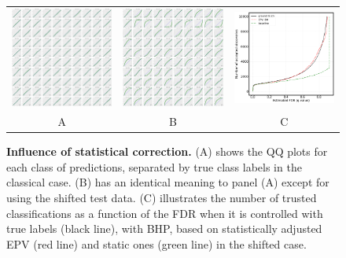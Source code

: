 \documentclass{article}
\begin{document}
\begin{figure}
    \centering
        \begin{tabular}{ccc}
 		\includegraphics[width=2in]{img/good_QQQ.png} &
		\includegraphics[width=2in]{img/bad_QQQ.png} & 
		\includegraphics[width=2in]{img/cnn_shift_stats_prove.png}
		\\	
		A & B & C
	\end{tabular}
	\caption{{\bf  Influence of statistical correction.}
        (A) shows the QQ plots for each class of predictions, separated by true class labels in the classical case. (B) has an identical meaning to panel (A) except for using the shifted test data. (C) illustrates the number of trusted classifications as a function of the FDR when it is controlled with true labels (black line), with BHP, based on statistically adjusted EPV (red line) and static ones (green line) in the shifted case.}
	\label{fig:influence}
\end{figure}
\end{document}
